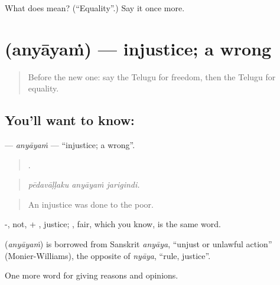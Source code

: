 \begin{tcolorbox}[breakable,colback=teal!4,colframe=teal!35!black,title={Before you move on}]
What does  mean? (\textquotedblleft{}Equality\textquotedblright{}.) Say it once more.
\end{tcolorbox}
\section[\texorpdfstring{\te{అన్యాయం} (anyāyaṁ)}{అన్యాయం (anyāyaṁ)}]{ (anyāyaṁ) — injustice; a wrong}

\label{lesson:TE-C399-anyayam}



\begin{quote}
Before the new one: say the Telugu for freedom, then the Telugu for equality.
\end{quote}

\subsection*{You'll want to know: }
\textbf{} — \emph{anyāyaṁ} — \textquotedblleft{}injustice; a wrong\textquotedblright{}.

\begin{quote}
  .
\end{quote}

\begin{quote}
\emph{pēdavāḷḷaku anyāyaṁ jarigindi.}
\end{quote}

\begin{quote}
An injustice was done to the poor.
\end{quote}

-, not, + , justice; , fair, which you know, is the same word.

\begin{cousinweb}
\textbf{} (\emph{anyāyaṁ}) is borrowed from Sanskrit \emph{anyāya}, \textquotedblleft{}unjust or unlawful action\textquotedblright{} (Monier-Williams), the opposite of \emph{nyāya}, \textquotedblleft{}rule, justice\textquotedblright{}.
\end{cousinweb}

\begin{grammarlens}[title={What you've built}]
One more word for giving reasons and opinions.
\end{grammarlens}

